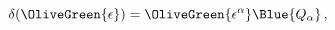 \begin{equation}
  \delta (\OliveGreen{\epsilon })=\OliveGreen{\epsilon ^\alpha}
\Blue{Q_\alpha}\,,
 \label{deltaEpsQ}
\end{equation}


